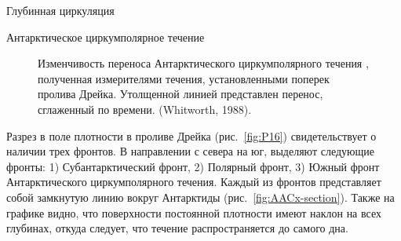 \begin{chapter}{Глубинная циркуляция}
\begin{section}{Антарктическое циркумполярное течение}
\begin{figure}[b!]
\caption{Изменчивость переноса%
Антарктического циркумполярного течения%
, полученная
измерителями течения, установленными поперек пролива Дрейка. 
Утолщенной линией представлен перенос, сглаженный по времени.
(Whitworth, 1988).}
\label{fig:aacxport}
\end{figure}
%
%

Разрез в поле плотности в проливе Дрейка (рис.~\ref{fig:P16})
свидетельствует о наличии трех фронтов. В направлении с севера на юг, 
выделяют следующие фронты: 1) Субантарктический фронт, 
2) Полярный фронт, 3) Южный фронт Антарктического циркумполярного течения. 
Каждый из фронтов представляет собой замкнутую линию вокруг Антарктиды
(рис.~\ref{fig:AACx-section}). Также на графике видно, что поверхности 
постоянной плотности имеют наклон на всех глубинах, откуда следует,
что течение распространяется до самого дна.
%


\end{section}
\end{chapter}

